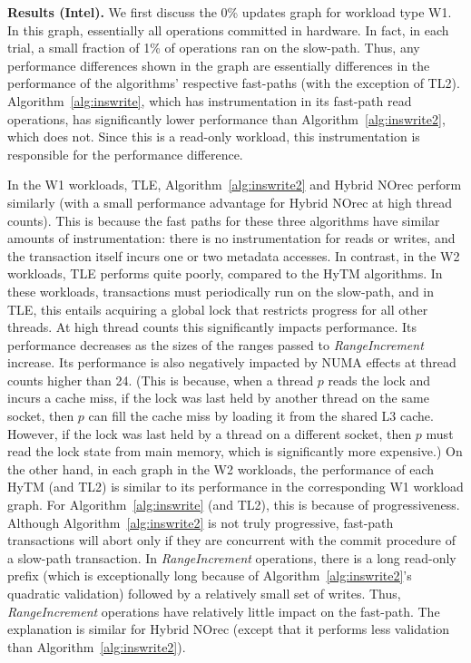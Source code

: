 \vspace{1mm}\noindent\textbf{Results (Intel).}
We first discuss the 0\% updates graph for workload type W1.
In this graph, essentially all operations committed in hardware.
In fact, in each trial, a small fraction of 1\% of operations ran on the slow-path.
Thus, any performance differences shown in the graph are essentially differences in the performance of the algorithms' respective fast-paths (with the exception of TL2).
Algorithm~\ref{alg:inswrite}, which has instrumentation in its fast-path read operations, has significantly lower performance than Algorithm~\ref{alg:inswrite2}, which does not.
Since this is a read-only workload, this instrumentation is responsible for the performance difference.

In the W1 workloads, TLE, Algorithm~\ref{alg:inswrite2} and Hybrid NOrec perform similarly (with a small performance advantage for Hybrid NOrec at high thread counts).
This is because the fast paths for these three algorithms have similar amounts of instrumentation: there is no instrumentation for reads or writes, 
and the transaction itself incurs one or two metadata accesses.
In contrast, in the W2 workloads, TLE performs quite poorly, compared to the HyTM algorithms.
In these workloads, transactions must periodically run on the slow-path, and in TLE, 
this entails acquiring a global lock that restricts progress for all other threads.
At high thread counts this significantly impacts performance.
Its performance decreases as the sizes of the ranges passed to \textit{RangeIncrement} increase.
Its performance is also negatively impacted by NUMA effects at thread counts higher than 24.
(This is because, when a thread $p$ reads the lock and incurs a cache miss, 
if the lock was last held by another thread on the same socket, 
then $p$ can fill the cache miss by loading it from the shared L3 cache.
However, if the lock was last held by a thread on a different socket, 
then $p$ must read the lock state from main memory, which is significantly more expensive.)
On the other hand, in each graph in the W2 workloads, the performance of each HyTM (and TL2) is similar to its performance in the corresponding W1 workload graph.
For Algorithm~\ref{alg:inswrite} (and TL2), this is because of progressiveness.
Although Algorithm~\ref{alg:inswrite2} is not truly progressive, fast-path transactions will abort only if they are concurrent with the commit procedure of a slow-path transaction.
In \textit{RangeIncrement} operations, there is a long read-only prefix (which is exceptionally long because of Algorithm~\ref{alg:inswrite2}'s quadratic validation) followed by a relatively small set of writes.
Thus, \textit{RangeIncrement} operations have relatively little impact on the fast-path.
The explanation is similar for Hybrid NOrec (except that it performs less validation than Algorithm~\ref{alg:inswrite2}).

